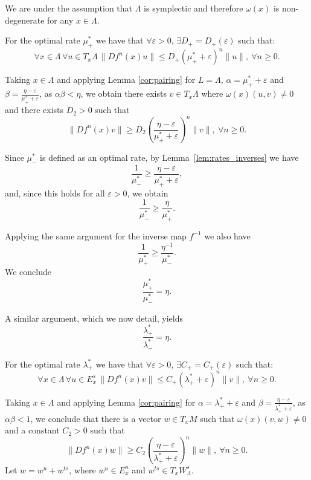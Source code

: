 \documentclass[11pt]{amsart}
\theoremstyle{definition}
\theoremstyle{remark}
\numberwithin{equation}{section}
\newcommand{\eps}{\varepsilon}
\begin{document}
We are under the assumption that $\Lambda$ is symplectic and therefore $\omega (x)$  is non-degenerate for any $x \in \Lambda$.

For the optimal rate  $\mu_+^*$ we have that $\forall\eps>0, \,\exists  D_+=D_+(\eps)$ such that:
\[
\forall x \in\Lambda\, \forall u\in T_x\Lambda\,
\|Df^n(x)u\|\leq D_+(\mu_+^*+\eps)^n\|u\|, \ \forall n\geq 0.
\]








Taking $x \in \Lambda$ and
applying Lemma  \ref{cor:pairing} for $L=\Lambda$, $\alpha=\mu_+^*+\eps$ and $\beta=\frac{\eta-\eps}{\mu_+^*+\eps}$, as $\alpha\beta<\eta$,  we obtain  there exists
$v\in T_x\Lambda$ where $\omega(x)(u,v)\ne 0$ and  there exists $D_2 > 0$  such that
\[
\|Df^n(x)v\|\geq D_2 \left (\frac{\eta-\eps}{\mu_+^*+\eps}\right)^n\|v\|, \ \forall n\ge 0.
\]



Since $\mu_-^*$ is defined as an optimal rate, by Lemma~\ref{lem:rates_inverses} we have
\[
\frac{1}{\mu_-^*}\geq \frac{\eta-\eps}{\mu_+^*+\eps},
\]
and, since this holds for all $\eps>0$, we obtain
\[
\frac{1}{\mu_-^*}\geq \frac{\eta}{\mu_+^*}.
\]

Applying the same argument for the inverse map $f^{-1}$   we also have
\[
\frac{1}{\mu_+^*}\geq \frac{\eta^{-1}}{\mu_-^*}.
\]
We conclude
\begin{equation}\label{eqn:MUMU}
 \frac{\mu_+^*}{\mu_-^*}=\eta.
\end{equation}


A similar argument, which we now detail,
 yields
\[
\frac{\lambda_+^*}{\lambda_-^*}=\eta.
\]


For the optimal rate  $\lambda_+^*$ we have that $\forall\eps>0, \,\exists C_+=C_+(\eps)$ such that:
\[
\forall x \in\Lambda\, \forall u \in E^s_x \,
\|Df^n(x)v\|\leq C_+(\lambda_+^*+\eps)^n\|v\|, \ \forall n\geq 0.
\]

Taking $x\in \Lambda$ and applying Lemma \ref{cor:pairing} for $\alpha=\lambda_+^*+\eps$   and $\beta=\frac{\eta-\eps}{\lambda_+^*+\eps}$, as $\alpha\beta<1$,
we conclude that there is a vector $w \in T_x M$ such
that $\omega(x)(v, w) \ne  0 $ and
a constant  $C_2>0$ such that
\begin{equation}\label{eqn:PR}
 \|Df^n(x) w  \| \ge C_2 \left ( \frac{\eta-\eps}{\lambda_+^* +\eps} \right)^n \|w\|, \  \forall n\ge 0.
\end{equation}
Let $w=w^u+w^{ts}$, where $w^u\in E^u_x$ and $w^{ts}\in T_xW^s_\Lambda$.
\end{document}
